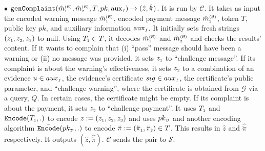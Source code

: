 \begin{definition}
\item  [$\bullet$] $\mathtt{genComplaint}(\hat m^{\scriptscriptstyle\mathcal{(B)}}_{\scriptscriptstyle 1}, \hat m^{\scriptscriptstyle\mathcal{(B)}}_{\scriptscriptstyle2}, T, pk, \text{aux}_{\scriptscriptstyle f})\rightarrow (\hat z, \hat{\ddot \pi})$. It is run by $\mathcal{C}$. It takes as input   the encoded warning message $\hat m^{\scriptscriptstyle\mathcal{(B)}}_{\scriptscriptstyle1}$, encoded payment message $\hat m^{\scriptscriptstyle\mathcal{(B)}}_{\scriptscriptstyle2}$,  token $T$, public key $pk$, and  auxiliary information $\text{aux}_{\scriptscriptstyle f}$. It initially sets fresh strings $(z_{\scriptscriptstyle 1}, z_{\scriptscriptstyle 2}, z_{\scriptscriptstyle 3})$ to null. Using $T_{\scriptscriptstyle 1}\in T$, it decodes  $\hat m^{\scriptscriptstyle\mathcal{(B)}}_{\scriptscriptstyle 1}$ and $\hat m^{\scriptscriptstyle\mathcal{(B)}}_{\scriptscriptstyle2}$ and checks the results' content. If it wants to complain that (i)   “pass” message should have been a warning  or (ii) no  message was provided,   it sets $z_{\scriptscriptstyle 1}$ to ``challenge message''. If its complaint is about the warning's effectiveness,  it sets $z_{\scriptscriptstyle 2}$ to a combination of an evidence $u\in aux_{\scriptscriptstyle f}$, the evidence's certificate $sig\in aux_{\scriptscriptstyle f}$, the certificate's public parameter,   and ``challenge warning'', where the certificate is obtained from  $\mathcal{G}$ via a query, $Q$. In certain cases, the certificate might be empty.  If its complaint is  about the   payment, it sets $z_{\scriptscriptstyle 3}$ to ``challenge payment''.  It uses $T_{\scriptscriptstyle 1}$ and  $\mathtt{Encode}(T_{\scriptscriptstyle 1}, .)$ to encode $z:=(z_{\scriptscriptstyle 1}, z_{\scriptscriptstyle 2}, z_{\scriptscriptstyle 3})$ and uses $pk_{\scriptscriptstyle\mathcal D}$ and another encoding algorithm  $\bar{\mathtt{Encode}}(pk_{\scriptscriptstyle\mathcal D}, .)$ to encode  $\ddot \pi:=(\ddot \pi_{\scriptscriptstyle 1},\ddot \pi_{\scriptscriptstyle 2})\in T$. This  results in $\hat z$ and $\hat {\ddot \pi}$ respectively. It outputs $(\hat z, \hat {\ddot \pi})$. $\mathcal{C}$ sends the pair to $\mathcal{S}$.
%
%


\end{definition}
